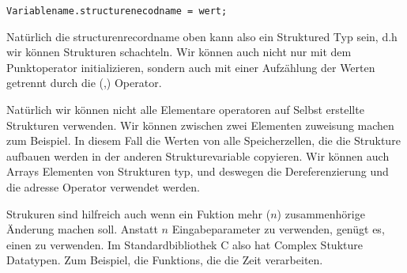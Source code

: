 \begin{lstlisting}
Variablename.structurenecodname = wert;
\end{lstlisting}
Natürlich die structurenrecordname oben kann also ein Struktured Typ sein, d.h wir können
Strukturen schachteln. Wir können auch nicht nur mit dem Punktoperator initializieren, sondern
auch mit einer Aufzählung der Werten getrennt durch die (,) Operator.

Natürlich wir können nicht alle Elementare operatoren auf Selbst
erstellte Strukturen verwenden. Wir können zwischen zwei Elementen zuweisung machen zum Beispiel.
In diesem Fall die Werten von alle Speicherzellen, die die Strukture aufbauen werden in der
anderen Strukturevariable copyieren. Wir können auch Arrays  Elementen von Strukturen typ, 
und deswegen die Dereferenzierung und die adresse Operator verwendet werden.

Strukuren sind hilfreich auch wenn ein Fuktion mehr ($n$) zusammenhörige Änderung machen soll. 
Anstatt $n$ Eingabeparameter zu verwenden, genügt es, einen zu verwenden. Im Standardbibliothek
C also hat Complex Stukture Datatypen. Zum Beispiel, die Funktions, die die Zeit verarbeiten.


